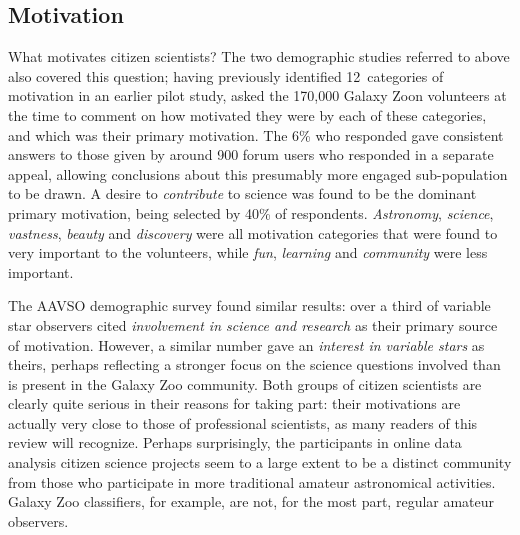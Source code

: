 \documentclass{ar2e}
\begin{document}

\subsection{Motivation}
\label{sec:crowd:motivation}


What motivates citizen scientists? The two demographic studies referred to above
also covered this question; having previously \citep{Rad++2010} identified 12~categories 
of motivation in an earlier pilot study, \citet{Rad++2013} asked the
170,000 Galaxy Zoon volunteers at the time to comment on how motivated they were
by each of these categories, and which was their primary motivation. The 6\% who
responded gave consistent answers to those given by around 900 forum users who
responded in a separate appeal, allowing conclusions about this presumably more
engaged sub-population to be drawn. A desire to {\it contribute} to science was
found to be the dominant primary motivation, being selected by 40\% of
respondents. {\it Astronomy}, {\it science}, {\it vastness}, {\it beauty} and 
{\it discovery} were all motivation categories that were found to very important
to the volunteers, while {\it fun}, {\it learning} and {\it community} were less
important. 

The AAVSO demographic survey \citep{P+P2012} found similar results: over a third
of variable star observers cited {\it involvement in science and research} as
their primary source of motivation. However, a similar number gave an {\it
interest in variable stars} as theirs, perhaps reflecting a stronger focus on
the science questions involved than is present in the Galaxy Zoo community. Both
groups of citizen scientists are clearly quite serious in their reasons for
taking part: their motivations are actually very close to those of professional
scientists, as many readers of this review will recognize. Perhaps surprisingly,
the participants in online data analysis citizen science projects seem to a
large extent to be a distinct community from those who participate in more
traditional amateur astronomical activities. Galaxy Zoo classifiers, for
example, are not, for the most part, regular amateur observers. 
\end{document}
